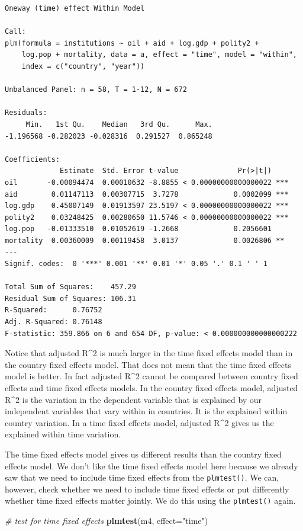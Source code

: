 \documentclass[]{article}
\newenvironment{Shaded}{\begin{snugshade}}{\end{snugshade}}
\newcommand{\KeywordTok}[1]{\textcolor[rgb]{0.13,0.29,0.53}{\textbf{#1}}}
\newcommand{\DataTypeTok}[1]{\textcolor[rgb]{0.13,0.29,0.53}{#1}}
\newcommand{\StringTok}[1]{\textcolor[rgb]{0.31,0.60,0.02}{#1}}
\newcommand{\CommentTok}[1]{\textcolor[rgb]{0.56,0.35,0.01}{\textit{#1}}}
\newcommand{\NormalTok}[1]{#1}
\theoremstyle{definition}
\theoremstyle{definition}
\theoremstyle{definition}
\theoremstyle{remark}
\begin{document}
\begin{verbatim}
Oneway (time) effect Within Model

Call:
plm(formula = institutions ~ oil + aid + log.gdp + polity2 + 
    log.pop + mortality, data = a, effect = "time", model = "within", 
    index = c("country", "year"))

Unbalanced Panel: n = 58, T = 1-12, N = 672

Residuals:
     Min.   1st Qu.    Median   3rd Qu.      Max. 
-1.196568 -0.282023 -0.028316  0.291527  0.865248 

Coefficients:
             Estimate  Std. Error t-value              Pr(>|t|)    
oil       -0.00094474  0.00010632 -8.8855 < 0.00000000000000022 ***
aid        0.01147113  0.00307715  3.7278             0.0002099 ***
log.gdp    0.45007149  0.01913597 23.5197 < 0.00000000000000022 ***
polity2    0.03248425  0.00280650 11.5746 < 0.00000000000000022 ***
log.pop   -0.01333510  0.01052619 -1.2668             0.2056601    
mortality  0.00360009  0.00119458  3.0137             0.0026806 ** 
---
Signif. codes:  0 '***' 0.001 '**' 0.01 '*' 0.05 '.' 0.1 ' ' 1

Total Sum of Squares:    457.29
Residual Sum of Squares: 106.31
R-Squared:      0.76752
Adj. R-Squared: 0.76148
F-statistic: 359.866 on 6 and 654 DF, p-value: < 0.000000000000000222
\end{verbatim}

Notice that adjusted R\^{}2 is much larger in the time fixed effects
model than in the country fixed effects model. That does not mean that
the time fixed effects model is better. In fact adjusted R\^{}2 cannot
be compared between country fixed effects and time fixed effects models.
In the country fixed effects model, adjusted R\^{}2 is the variation in
the dependent variable that is explained by our independent variables
that vary within in countries. It is the explained within country
variation. In a time fixed effects model, adjusted R\^{}2 gives us the
explained within time variation.

The time fixed effects model gives us different results than the country
fixed effects model. We don't like the time fixed effects model here
because we already saw that we need to include time fixed effects from
the \texttt{plmtest()}. We can, however, check whether we need to
include time fixed effects or put differently whether time fixed effects
matter jointly. We do this using the \texttt{plmtest()} again.

\begin{Shaded}
\begin{Highlighting}[]
\CommentTok{# test for time fixed effects}
\KeywordTok{plmtest}\NormalTok{(m4, }\DataTypeTok{effect=}\StringTok{"time"}\NormalTok{)}
\end{Highlighting}
\end{Shaded}
\end{document}
